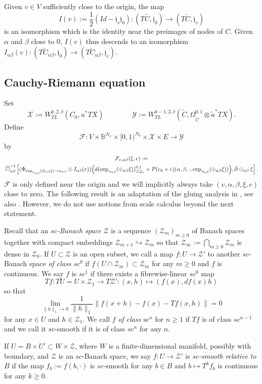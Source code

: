 \documentclass[11pt,psamsfonts, oneside, reqno]{amsart}
\newcommand{\hkra}{\hookrightarrow}
\newcommand{\inter}[2]{\bigcap\limits_{#1}{#2}}%
\newcommand{\sub}{\subset}%
\newcommand{\inv}{^{-1}}
\newcommand{\limes}[3]{\lim\limits_{#1 \rightarrow #2}{#3}}
\newcommand{\norm}[1]{\lVert#1\rVert}
\newcommand{\cl}{\colon}
\newcommand{\lbr}[1]{\Bigl(#1\Bigr)}
\newcommand{\Ide}{Id}
\newcommand{\delbar}{\bar\partial}
\newcommand{\bB}{\mathbb{B}}
\newcommand{\cF}{\mathcal{F}}
\newcommand{\cX}{\mathcal{X}}
\newcommand{\cY}{\mathcal{Y}}
\newcommand{\cZ}{\mathcal{Z}}
\newcommand{\fJ}{\mathfrak{J}}
\newcommand{\fj}{\mathfrak{j}}
\newcommand{\wt}{\widetilde}
\newcommand{\wh}{\widehat}
\theoremstyle{definition}
\theoremstyle{remark}
\numberwithin{equation}{section}
\begin{document}
\noindent
Given $v \in V$ sufficiently close to the origin, the map 
$$I(v) := \frac12(\Ide-\fj_v\fj_0) \cl (T\wt C,\fj_0)\to (T\wt C,\fj_v)$$\noindent
is an isomorphism which is the identity near the preimages of nodes of $C$. Given $\alpha$ and $\beta$ close to $0$, $I(v)$ thus descends to an isomorphism $I_{\alpha\beta}(v)\cl(T\wt C_{\alpha\beta},\fj_0)\to (T\wt C_{\alpha\beta},\fj_v)$.


\subsection{Cauchy-Riemann equation}\label{subsec:gluing-estimates}
Set $$\cX := W^{k,2,\delta}_{TL}(C_0,u^*TX)\qquad \qquad \cY:= W^{k-1,2,\delta}_{TL}(\wt C,\Omega^{0,1}_{\wt C}\otimes \wt{u}^*TX).$$\noindent 
Define 
$$\cF\cl V\times \bB^{N_x}\times [0,1)^{N_b}\times \cX\times E\to \cY$$\noindent
by 
\begin{multline}\label{eq:cr-map} \cF_{v,\alpha\beta}(\xi,e) :=\\\, \wh\boxdot_{\alpha\beta}\inv\left[(\Phi_{\exp_{u_{\alpha\beta}}(\oplus_{\alpha\beta}\xi)\to u_{\alpha\beta}}\otimes I_{\alpha\beta}(v))\lbr{ d(\exp_{u_{\alpha\beta}}(\oplus_{\alpha\beta}\xi))^{0,1}_{J,\fJ_v}+ P(e_0+e)(\alpha,\beta,\cdot,\exp_{u_{\alpha\beta}}(\oplus_{\alpha\beta}\xi))},\delbar\ominus_{\alpha\beta}\xi\right].\end{multline}
 $\cF$ is only defined near the origin and we will implicitly always take $(v,\alpha,\beta,\xi,e)$ close to zero. The following result is an adaptation of the gluing analysis in \cite{HWZ17}, see also \cite{Jem20}. However, we do not use notions from scale calculus beyond the next statement.\par
  Recall that an \emph{$sc$-Banach space} $\cZ$ is a sequence $(\cZ_m)_{m\geq 0}$ of Banach spaces together with compact embeddings $\cZ_{m+1}\hkra \cZ_m$ so that $\cZ_\infty := \inter{m\geq 0}{\cZ_m}$ is dense in $\cZ_0$. If $U \sub \cZ$ is an open subset, we call a map $f \cl U\to \cZ'$ to another $sc$-Banach space \emph{of class $sc^0$} if $f(U\cap \cZ_m)\sub\cZ_m$ for any $m\geq 0$ and $f$ is continuous. We say $f$ is \emph{$sc^1$} if there exists a fibrewise-linear ${sc}^0$ map 
  $$Tf \cl TU = U\times \cZ_1\to T\cZ' : (x,h)\mapsto (f(x),df(x)h)$$\noindent
  so that 
  $$\limes{\norm{h}_1}{0}{\frac{1}{\norm{h}_1}\norm{f(x+h)-f(x)-Tf(x,h)}} =0$$\noindent
  for any $x \in U$ and $h \in \cZ_1$. We call $f$ \emph{of class $\text{sc}^n$} for $n \geq 1$ if $Tf$ is of class $sc^{n-1}$ and we call it $sc$-smooth if it is of class $sc^n$ for any $n$.\par 
  If $U = B\times U' \sub W\times \cZ$, where $ W$ is a finite-dimensional manifold, possibly with boundary, and $\cZ$ is an $sc$-Banach space, we say $f \cl U \to \cZ'$ is \emph{$sc$-smooth relative to $B$} if the map $f_b := f(b,\cdot)$ is $sc$-smooth for any $b\in B$ and $b \mapsto T^kf_b$ is continuous for any $k \geq 0$.
\end{document}
